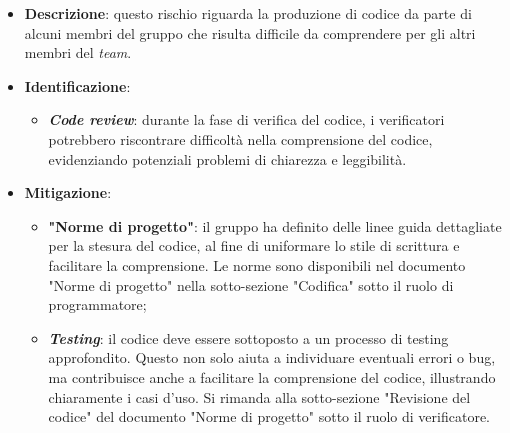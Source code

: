 \label{risk:codice incomprensibile}
\begin{itemize}
	\item \textbf{Descrizione}: questo rischio riguarda la produzione di codice 
								da parte di alcuni membri del gruppo che risulta 
								difficile da comprendere per gli altri membri del \textit{team}.
	\item \textbf{Identificazione}:
	      \begin{itemize}
		      \item \textbf{\textit{Code review}}: durante la fase di verifica del codice, 
			  									i verificatori potrebbero riscontrare difficoltà 
												nella comprensione del codice, evidenziando 
												potenziali problemi di chiarezza e leggibilità.
	      \end{itemize}

	\item \textbf{Mitigazione}:
	      \begin{itemize}
		      \item \textbf{"Norme di progetto"}: il gruppo ha definito delle linee guida dettagliate 
			  		per la stesura del codice, al fine di uniformare lo stile di scrittura e facilitare 
					la comprensione. Le norme sono disponibili nel documento "Norme di progetto" 
					nella sotto-sezione "Codifica" sotto il ruolo di programmatore;

		      \item \textbf{\textit{Testing}}: il codice deve essere sottoposto a un processo di 
			  		testing approfondito. Questo non solo aiuta a individuare eventuali errori o bug, 
					ma contribuisce anche a facilitare la comprensione del codice, illustrando 
					chiaramente i casi d'uso. Si rimanda alla sotto-sezione "Revisione del codice" 
					del documento "Norme di progetto" sotto il ruolo di verificatore.
	      \end{itemize}
\end{itemize}
